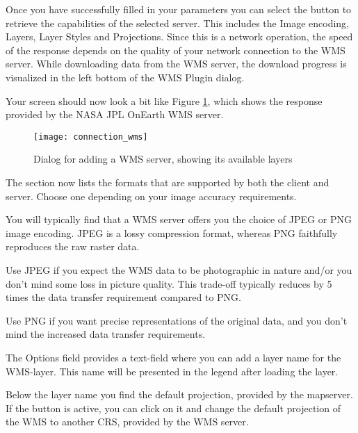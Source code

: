 Once you have successfully filled in your parameters you can select the
button to retrieve the capabilities of the selected server.  This includes the 
Image encoding, Layers, Layer Styles and Projections. Since this is a network 
operation, the speed of the response depends on the quality of your network
connection to the WMS server. While downloading data from the WMS server, the 
download progress is visualized in the left bottom of the WMS Plugin dialog.

Your screen should now look a bit like Figure \ref{fig:connection_wms}, which shows the
response provided by the NASA JPL OnEarth WMS server.

\begin{figure}[ht]
  \centering
  \texttt{[image: connection\_wms]}
  \caption{Dialog for adding a WMS server, showing its available layers \nixcaption}\label{fig:connection_wms}
\end{figure}


The  section now lists the formats that are supported by both
the client and server.  Choose one depending on your image accuracy requirements.

\begin{Tip}[ht]\caption{\textsc{Image Encoding}}
You will typically find that a WMS server offers you the choice
of JPEG or PNG image encoding.  JPEG is a lossy compression format,
whereas PNG faithfully reproduces the raw raster data.

Use JPEG if you expect the WMS data to be photographic in nature and/or you don't
mind some loss in picture quality.  This trade-off typically reduces by 5 times
the data transfer requirement compared to PNG.

Use PNG if you want precise representations of the original data, and you don't mind
the increased data transfer requirements.
\end{Tip}


The Options field provides a text-field where you can add a layer name
for the WMS-layer. This name will be presented in the legend after loading
the layer.

Below the layer name you find the default projection, provided by the mapserver. 
If the  button is active, you can click on it and change the 
default projection of the WMS to another CRS, provided by the WMS server.

